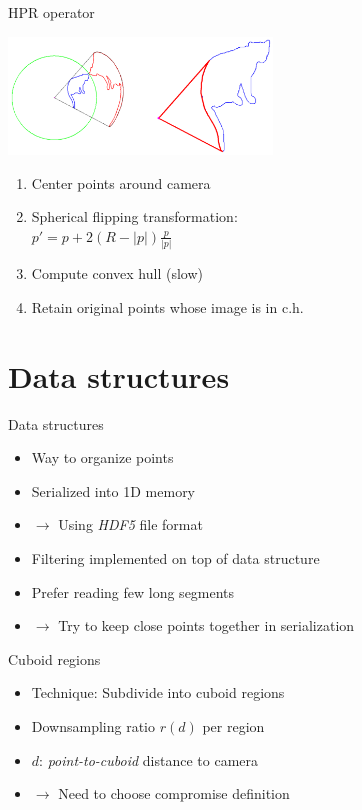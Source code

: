 \documentclass{beamer}
\begin{document}
\begin{frame}{HPR operator}
	\begin{center}
		\includegraphics[width=7cm]{hpr.png}
	\end{center}
	\begin{enumerate}
	\item Center points around camera
	\item Spherical flipping transformation: \\
	$p' = p + 2(R - |p|) \frac{p}{|p|}$
	\item Compute convex hull (slow)
	\item Retain original points whose image is in c.h.
	\end{enumerate}
\end{frame}

\section{Data structures}

\begin{frame}{Data structures}
	\begin{itemize}
	\item Way to organize points
	\item Serialized into 1D memory
	\item $\rightarrow$ Using \emph{HDF5} file format
	\item Filtering implemented on top of data structure
	\item Prefer reading few long segments
	\item $\rightarrow$ Try to keep close points together in serialization
	\end{itemize}
\end{frame}

\begin{frame}{Cuboid regions}
	\begin{itemize}
	\item Technique: Subdivide into cuboid regions
	\item Downsampling ratio $r(d)$ per region
	\item $d$: \emph{point-to-cuboid} distance to camera
	\item $\rightarrow$ Need to choose compromise definition
	\end{itemize}
\end{frame}
\end{document}
